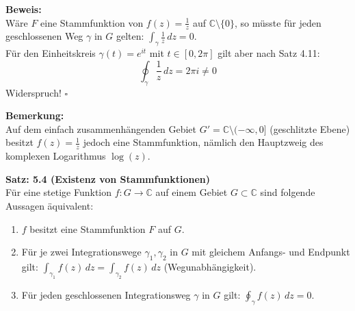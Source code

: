 \vspace{1em}
\noindent\textbf{Beweis:} \\
Wäre $F$ eine Stammfunktion von $f(z) = \frac{1}{z}$ auf $\mathbb{C} \setminus \{0\}$, so müsste für jeden geschlossenen Weg $\gamma$ in $G$ gelten: $\int_{\gamma} \frac{1}{z} \, dz = 0$. \\
Für den Einheitskreis $\gamma(t) = e^{it}$ mit $t \in [0, 2\pi]$ gilt aber nach Satz 4.11:
\[
\oint_{\gamma} \frac{1}{z} \, dz = 2\pi i \neq 0
\]
Widerspruch! \hfill $\square$

\vspace{1em}
\noindent\textbf{Bemerkung:} \\
Auf dem einfach zusammenhängenden Gebiet $G' = \mathbb{C} \setminus (-\infty, 0]$ (geschlitzte Ebene) besitzt $f(z) = \frac{1}{z}$ jedoch eine Stammfunktion, nämlich den Hauptzweig des komplexen Logarithmus $\log(z)$.

\vspace{1em}
\noindent\textbf{Satz: 5.4 (Existenz von Stammfunktionen)} \\
Für eine stetige Funktion $f: G \rightarrow \mathbb{C}$ auf einem Gebiet $G \subset \mathbb{C}$ sind folgende Aussagen äquivalent:
\begin{enumerate}
    \item[i)] $f$ besitzt eine Stammfunktion $F$ auf $G$.
    \item[ii)] Für je zwei Integrationswege $\gamma_1, \gamma_2$ in $G$ mit gleichem Anfangs- und Endpunkt gilt: $\int_{\gamma_1} f(z) \, dz = \int_{\gamma_2} f(z) \, dz$ (Wegunabhängigkeit).
    \item[iii)] Für jeden geschlossenen Integrationsweg $\gamma$ in $G$ gilt: $\oint_{\gamma} f(z) \, dz = 0$.
\end{enumerate}

